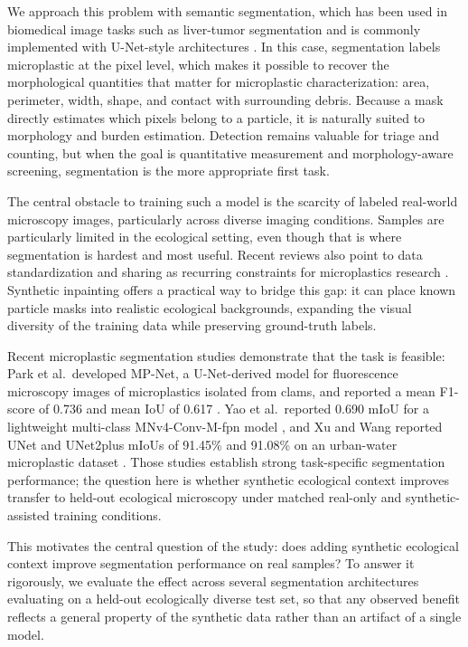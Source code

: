 \documentclass[11pt]{article}
\begin{document}
We approach this problem with semantic segmentation, which has been used in biomedical image tasks such as liver-tumor segmentation and is commonly implemented with U-Net-style architectures \cite{4,18}. In this case, segmentation labels microplastic at the pixel level, which makes it possible to recover the morphological quantities that matter for microplastic characterization: area, perimeter, width, shape, and contact with surrounding debris. Because a mask directly estimates which pixels belong to a particle, it is naturally suited to morphology and burden estimation. Detection remains valuable for triage and counting, but when the goal is quantitative measurement and morphology-aware screening, segmentation is the more appropriate first task.

The central obstacle to training such a model is the scarcity of labeled real-world microscopy images, particularly across diverse imaging conditions. Samples are particularly limited in the ecological setting, even though that is where segmentation is hardest and most useful. Recent reviews also point to data standardization and sharing as recurring constraints for microplastics research \cite{5,8}. Synthetic inpainting offers a practical way to bridge this gap: it can place known particle masks into realistic ecological backgrounds, expanding the visual diversity of the training data while preserving ground-truth labels.

Recent microplastic segmentation studies demonstrate that the task is feasible: Park et al.\ developed MP-Net, a U-Net-derived model for fluorescence microscopy images of microplastics isolated from clams, and reported a mean F1-score of 0.736 and mean IoU of 0.617 \cite{28}. Yao et al.\ reported 0.690 mIoU for a lightweight multi-class MNv4-Conv-M-fpn model \cite{24}, and Xu and Wang reported UNet and UNet2plus mIoUs of 91.45\% and 91.08\% on an urban-water microplastic dataset \cite{25}. Those studies establish strong task-specific segmentation performance; the question here is whether synthetic ecological context improves transfer to held-out ecological microscopy under matched real-only and synthetic-assisted training conditions.

This motivates the central question of the study: does adding synthetic ecological context improve segmentation performance on real samples? To answer it rigorously, we evaluate the effect across several segmentation architectures evaluating on a held-out ecologically diverse test set, so that any observed benefit reflects a general property of the synthetic data rather than an artifact of a single model.
\end{document}

